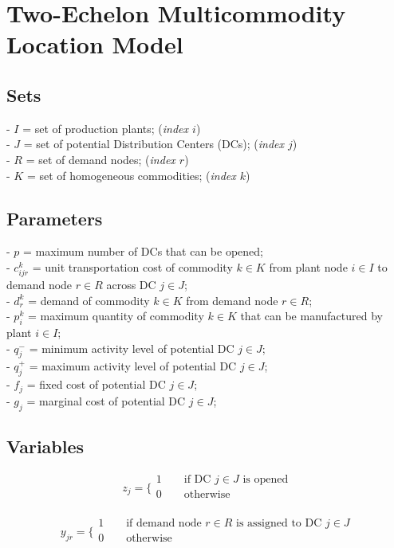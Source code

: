 \documentclass[a4paper,12pt,titlepage]{article}
\begin{document}
\section*{Two-Echelon Multicommodity Location Model}
\subsection*{Sets}
- $I$ = set of production plants; (\textit{index $i$})\\
- $J$ = set of potential Distribution Centers (DCs); (\textit{index $j$})\\
- $R$ = set of demand nodes; (\textit{index $r$})\\
- $K$ = set of homogeneous commodities; (\textit{index $k$})
\subsection*{Parameters}
- $p$ = maximum number of DCs that can be opened;\\
- $c_{ijr}^k$ = unit transportation cost of commodity $k\in K$ from plant node $i\in I$ to demand node $r\in R$ across DC $j\in J$;\\
- $d_{r}^k$ = demand of commodity $k\in K$ from demand node $r\in R$;\\
- $p_{i}^k$ = maximum quantity of commodity $k\in K$ that can be manufactured by plant $i\in I$;\\
- $q_{j}^-$ = minimum activity level of potential DC $j\in J$;\\
- $q_{j}^+$ = maximum activity level of potential DC $j\in J$;\\
- $f_{j}$ = fixed cost of potential DC $j\in J$;\\
- $g_{j}$ = marginal cost of potential DC $j\in J$;
\subsection*{Variables}

$$z_j=
\bigg \{
\begin{array}{ll}
1\qquad \text{if DC $j\in J$ is opened}\\
0\qquad \text{otherwise}\\
\end{array}
$$

$$y_{jr}=
\bigg \{
\begin{array}{ll}
1\qquad \text{if demand node $r\in R$ is assigned to DC $j\in J$}\\
0\qquad \text{otherwise}\\
\end{array}
$$
\end{document}
